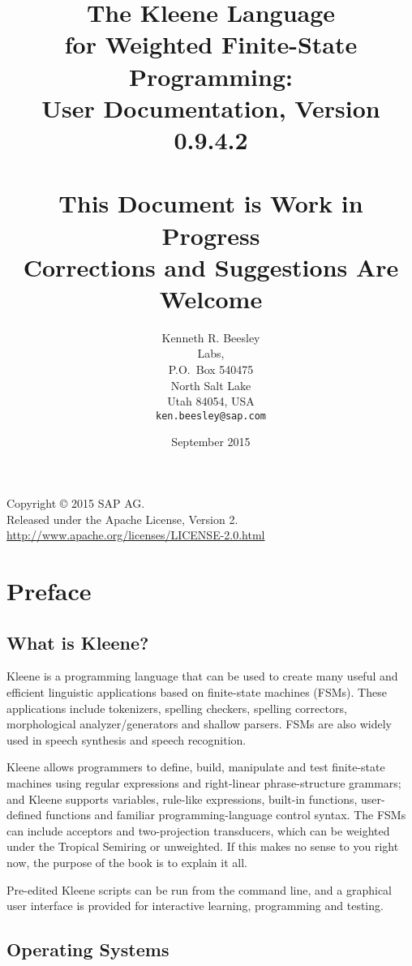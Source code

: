 \documentclass[letterpaper,12pt]{book}
\title{The Kleene Language\\
for Weighted Finite-State Programming:\\
{\Large User Documentation, Version 0.9.4.2}\\
\mbox{}\\
{\Large This Document is Work in Progress\\
Corrections and Suggestions Are Welcome}}
\author{Kenneth R. Beesley\\
\init{sap} Labs, \init{LLC}\\
P.O.~Box 540475\\
North Salt Lake\\
Utah 84054, USA\\
\texttt{ken.beesley@sap.com}}
\date{September 2015}
\providecommand{\init}{}\renewcommand{\init}{\MakeUppercase}
\newcommand{\Kleene}{Kleene}
\newcommand{\fsm}{\init{fsm}}
\begin{document}
\VerbatimFootnotes

\maketitle

\null\vfill
\thispagestyle{empty}
\begin{center}
Copyright \copyright{} 2015 SAP AG.\\
Released under the Apache License, Version 2.\\
\url{http://www.apache.org/licenses/LICENSE-2.0.html}
\end{center}
\newpage

\frontmatter

\section*{Preface}

\subsection*{What is Kleene?}

Kleene is a programming language that can be used to create many useful and
efficient linguistic applications based on finite-state machines
(\fsm{}s).  These applications include tokenizers, spelling checkers, spelling correctors,
morphological analyzer/generators and shallow parsers.  
\fsm{}s are also widely used
in speech synthesis and speech recognition.

\Kleene{} allows programmers to define, build, manipulate and test 
finite-state machines using regular expressions
and right-linear phrase-structure grammars; and Kleene supports variables,
rule-like expressions, built-in functions, user-defined 
functions and familiar programming-language control
syntax.  The \fsm{}s can include acceptors and two-projection
transducers, which can be weighted under the Tropical Semiring or unweighted.
If this makes no sense to you right now, the purpose of the book is to
explain it all.

Pre-edited \Kleene{} scripts can be run from the command line, and a
graphical user interface is provided for interactive learning, programming
and testing.

\subsection*{Operating Systems}
\end{document}
